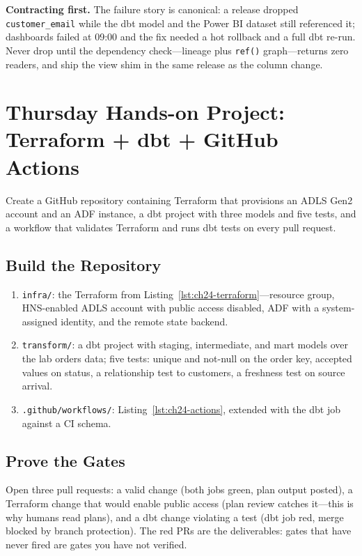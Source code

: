 \begin{pitfall}
\textbf{Contracting first.} The failure story is canonical: a release dropped \texttt{customer\_email} while the dbt model and the Power BI dataset still referenced it; dashboards failed at 09:00 and the fix needed a hot rollback and a full dbt re-run. Never drop until the dependency check---lineage plus \texttt{ref()} graph---returns zero readers, and ship the view shim in the same release as the column change.
\end{pitfall}

\section{Thursday Hands-on Project: Terraform + dbt + GitHub Actions}
Create a GitHub repository containing Terraform that provisions an ADLS Gen2 account and an ADF instance, a dbt project with three models and five tests, and a workflow that validates Terraform and runs dbt tests on every pull request.

\subsection{Build the Repository}
\begin{enumerate}
    \item \texttt{infra/}: the Terraform from Listing~\ref{lst:ch24-terraform}---resource group, HNS-enabled ADLS account with public access disabled, ADF with a system-assigned identity, and the remote state backend.
    \item \texttt{transform/}: a dbt project with staging, intermediate, and mart models over the lab orders data; five tests: unique and not-null on the order key, accepted values on status, a relationship test to customers, a freshness test on source arrival.
    \item \texttt{.github/workflows/}: Listing~\ref{lst:ch24-actions}, extended with the dbt job against a CI schema.
\end{enumerate}

\subsection{Prove the Gates}
Open three pull requests: a valid change (both jobs green, plan output posted), a Terraform change that would enable public access (plan review catches it---this is why humans read plans), and a dbt change violating a test (dbt job red, merge blocked by branch protection). The red PRs are the deliverables: gates that have never fired are gates you have not verified.

